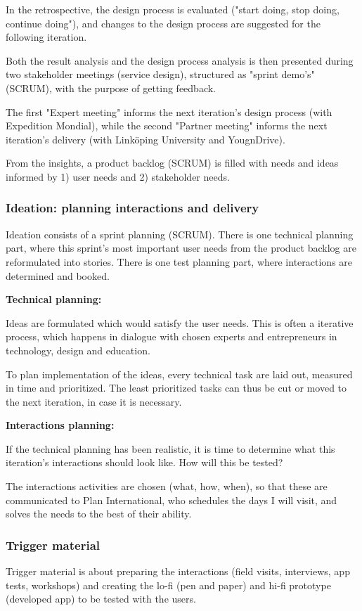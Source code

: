     In the retrospective, the design process is evaluated ("start doing, stop doing, continue doing"), and changes to the design process are suggested for the following iteration.

    Both the result analysis and the design process analysis is then presented during two stakeholder meetings (service design), structured as "sprint demo's" (SCRUM), with the purpose of getting feedback.

    The first "Expert meeting" informs the next iteration's design process (with Expedition Mondial), while the second "Partner meeting" informs the next iteration's delivery (with Linköping University and YougnDrive).

    From the insights, a product backlog (SCRUM) is filled with needs and ideas informed by 1) user needs and 2) stakeholder needs.

\subsubsection{Ideation: planning interactions and delivery}
  Ideation consists of a sprint planning (SCRUM). There is one technical planning part, where this sprint's most important user needs from the product backlog are reformulated into stories. There is one test planning part, where interactions are determined and booked.

    \textbf{Technical planning: }

      Ideas are formulated which would satisfy the user needs. This is often a iterative process, which happens in dialogue with chosen experts and entrepreneurs in technology, design and education.

      To plan implementation of the ideas, every technical task are laid out, measured in time and prioritized. The least prioritized tasks can thus be cut or moved to the next iteration, in case it is necessary.

    \textbf{Interactions planning: }

      If the technical planning has been realistic, it is time to determine what this iteration's interactions should look like. How will this be tested?

      The interactions activities are chosen (what, how, when), so that these are communicated to Plan International, who schedules the days I will visit, and solves the needs to the best of their ability.

  \subsubsection{Trigger material}
  Trigger material is about preparing the interactions (field visits, interviews, app tests, workshops) and creating the lo-fi (pen and paper) and hi-fi prototype (developed app) to be tested with the users.


